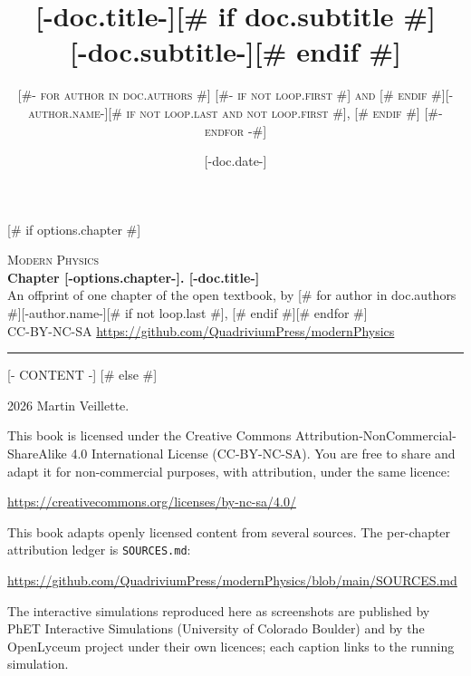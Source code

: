 \documentclass[letterpaper,11pt]{article}
[# else #]
\title{\Huge \textbf{[-doc.title-]}[# if doc.subtitle #] \\[0.5em] \huge [-doc.subtitle-][# endif #]}
\author{\textsc{
[#- for author in doc.authors #]
  [#- if not loop.first #] and [# endif #][-author.name-][# if not loop.last and not loop.first #], [# endif #]
[#- endfor -#]
}}
[# if doc.date #]\date{[-doc.date-]}[# endif #]
\begin{document}
\sloppy

[# if options.chapter #]
\thispagestyle{plain}
\begin{center}
  {\small\scshape\color{mpgray} Modern Physics}\\[0.35em]
  {\LARGE\bfseries Chapter [-options.chapter-]. [-doc.title-]}\\[0.6em]
  {\small An offprint of one chapter of the open textbook, by
   [# for author in doc.authors #][-author.name-][# if not loop.last #], [# endif #][# endfor #]}\\[0.2em]
  {\small\color{mpgray} CC\--BY\--NC\--SA \textperiodcentered{}
   \url{https://github.com/QuadriviumPress/modernPhysics}}
\end{center}
\vspace{1em}
\hrule
\vspace{1.5em}

[- CONTENT -]
[# else #]
\frontmatter
\hypersetup{pageanchor=false}
\maketitle

\thispagestyle{empty}
\null\vfill
\noindent\small
\textcopyright{} 2026 Martin Veillette.\par\medskip
\noindent This book is licensed under the Creative Commons
Attribution\--NonCommercial\--ShareAlike 4.0 International License
(CC\--BY\--NC\--SA). You are free to share and adapt it for
non-commercial purposes, with attribution, under the same licence:\par\smallskip
\noindent\url{https://creativecommons.org/licenses/by-nc-sa/4.0/}\par\medskip
\noindent This book adapts openly licensed content from several sources. The
per-chapter attribution ledger is \texttt{SOURCES.md}:\par\smallskip
\noindent\url{https://github.com/QuadriviumPress/modernPhysics/blob/main/SOURCES.md}
\par\medskip
\noindent The interactive simulations reproduced here as screenshots are
published by PhET Interactive Simulations (University of Colorado Boulder) and
by the OpenLyceum project under their own licences; each caption links to the
running simulation.
\par\vfill\normalsize
\end{document}
